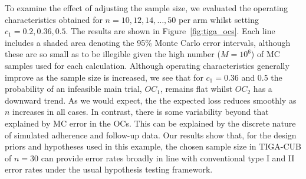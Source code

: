 \documentclass[AMA,STIX1COL]{WileyNJD-v2}
\begin{document}
To examine the effect of adjusting the sample size, we evaluated the operating characteristics obtained for $n = 10, 12, 14, \ldots , 50$ per arm whilst setting $c_1 = 0.2, 0.36, 0.5$. The results are shown in Figure~\ref{fig:tiga_ocs}. Each line includes a shaded area denoting the 95\% Monte Carlo error intervals, although these are so small as to be illegible given the high number ($M = 10^6$) of MC samples used for each calculation. Although operating characteristics generally improve as the sample size is increased, we see that for $c_1 = 0.36$ and 0.5 the probability of an infeasible main trial, $OC_1$, remains flat whilst $OC_2$ has a downward trend. As we would expect, the  the expected loss reduces smoothly as $n$ increases in all cases. In contrast, there is some variability beyond that explained by MC error in the OCs. This can be explained by the discrete nature of simulated adherence and follow-up data. Our results show that, for the design priors and hypotheses used in this example, the chosen sample size in TIGA-CUB of $n=30$ can provide error rates broadly in line with conventional type I and II error rates under the usual hypothesis testing framework.
\end{document}
